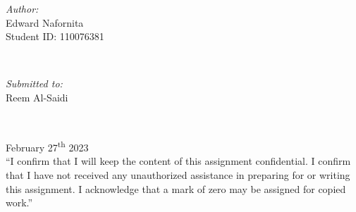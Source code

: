 \begin{titlepage}
    
    \begin{minipage}{0.4\textwidth}
    \begin{flushleft} \large
    \emph{Author:}\\
    Edward Nafornita \\ 
    Student ID: 110076381
    \end{flushleft}
    \end{minipage}
    ~
    \begin{minipage}{0.4\textwidth}
    \begin{flushright} \large
    \emph{Submitted to:} \\
    Reem Al-Saidi \\[1.2em] 
    \end{flushright}
    \end{minipage}\\[2cm]
    \makeatother
    
    
    {\large February 27\textsuperscript{th} 2023}\\[2cm]
    
    ``I confirm that I will keep the content of this assignment confidential. I confirm that I have not received any unauthorized 
    assistance in preparing for or writing this assignment. I acknowledge that a mark of zero may be assigned for copied work.''
    \vfill %
    \end{titlepage}